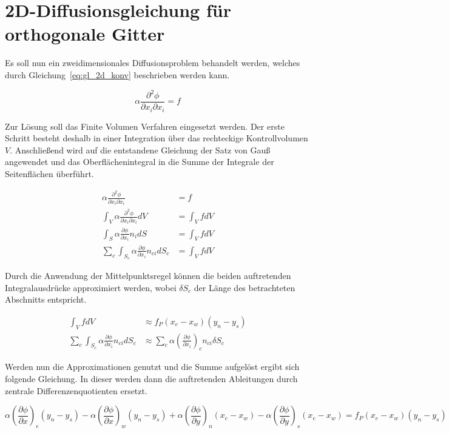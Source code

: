 \documentclass[10pt, ngerman,colorback,accentcolor=tud2d]{tudreport}
\begin{document}
\chapter{2D-Diffusionsgleichung für orthogonale Gitter}
\label{chap:2D-Diffusionsgleichung}
\newcommand{\dx}{(x_e-x_w)}
\newcommand{\dy}{(y_n-y_s)}

Es soll nun ein zweidimensionales Diffusionsproblem behandelt werden, welches durch
Gleichung~\eqref{eq:gl_2d_konv} beschrieben werden kann.

\begin{equation}
  \alpha \frac{\partial^2\phi}{\partial x_i \partial x_i} = f
  \label{eq:gl_2d_konv}
\end{equation}

Zur Lösung soll das Finite Volumen Verfahren eingesetzt werden. Der erste Schritt besteht
deshalb in einer Integration über das rechteckige Kontrollvolumen $V$. Anschließend wird auf die
entstandene Gleichung der Satz von Gauß angewendet und das Oberflächenintegral in die
Summe der Integrale der Seitenflächen überführt.

\begin{align*}
  \alpha \frac{\partial^2\phi}{\partial x_i \partial x_i} &= f\\
  \int_V \alpha \frac{\partial^2\phi}{\partial x_i \partial x_i} dV &= \int_V f dV\\
  \int_S \alpha \frac{\partial \phi}{\partial x_i}n_i dS &= \int_V f dV\\
  \sum_c \int_{S_c} \alpha \frac{\partial \phi}{\partial x_i}n_{ci} dS_c &= \int_V f dV
\end{align*}

Durch die Anwendung der Mittelpunktsregel können die beiden auftretenden Integralausdrücke
approximiert werden, wobei $\delta S_c$ der Länge des betrachteten Abschnitts entspricht.

\begin{align*}
  \int_V f dV &\approx f_P \dx \dy\\
  \sum_c \int_{S_c} \alpha \frac{\partial \phi}{\partial x_i}n_{ci} dS_c &\approx
  \sum_c \alpha \left({\frac{\partial \phi}{\partial x_i}}\right)_c n_{ci} \delta S_c
\end{align*}

Werden nun die Approximationen genutzt und die Summe aufgelöst ergibt sich folgende
Gleichung. In dieser werden dann die auftretenden Ableitungen durch zentrale
Differenzenquotienten ersetzt.

\begin{equation*}
  \alpha \left({\frac{\partial \phi}{\partial x}}\right)_e \dy -
  \alpha \left({\frac{\partial \phi}{\partial x}}\right)_w \dy +
  \alpha \left({\frac{\partial \phi}{\partial y}}\right)_n \dx -
  \alpha \left({\frac{\partial \phi}{\partial y}}\right)_s \dx =
  f_P \dx \dy
\end{equation*}
\end{document}

